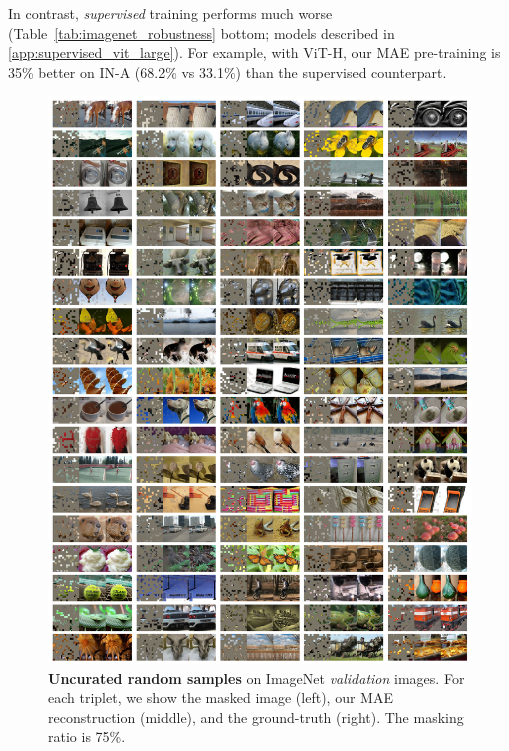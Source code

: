 \documentclass[10pt,twocolumn,letterpaper]{article}
\begin{document}
In contrast, \textit{supervised} training performs much worse (Table~\ref{tab:imagenet_robustness} bottom; models described in \ref{app:supervised_vit_large}). For example, with ViT-H, our MAE pre-training is 35\% better on IN-A (68.2\% vs 33.1\%) than the supervised counterpart.

\newpage

\begin{figure}[t]\centering\vspace{-3em}
\includegraphics[width=1\linewidth]{fig/samples_uncurated}\vspace{-1em}
\caption{\textbf{Uncurated random samples} on ImageNet \textit{validation} images. For each triplet, we show the masked image (left), our MAE reconstruction (middle), and the ground-truth (right). The masking ratio is 75\%.}
\label{fig:samples_uncurated}
\end{figure}
\vfill
\end{document}
